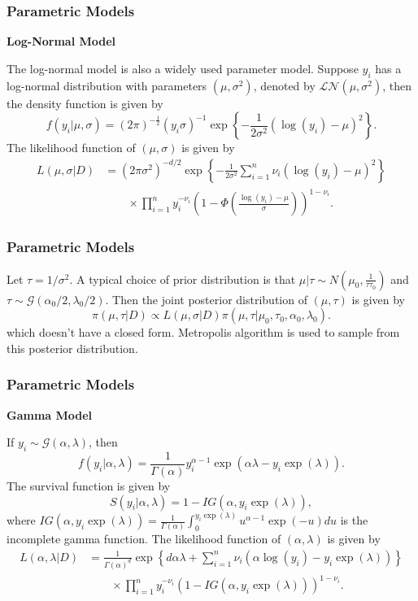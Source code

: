 \documentclass{beamer}
\begin{document}
	\begin{frame}
		\frametitle{Parametric Models}
		\textbf{Log-Normal Model}
		
		The log-normal model is also a widely used parameter model. Suppose $y_i$ has a log-normal distribution with parameters $(\mu, \sigma ^ 2 )$, denoted by $\mathcal{LN}(\mu, \sigma ^ 2)$, then the density function is given by 
		\[
		f(y_i | \mu, \sigma) = (2\pi) ^ {-\frac{1}{2}}(y_i\sigma) ^ {-1}\exp\left\{-\frac{1}{2\sigma^2}(\log(y_i) - \mu) ^ 2\right\}.
		\]
		The likelihood function of $(\mu, \sigma)$ is given by 
		\begin{equation*}
			\begin{split}
				L(\mu, \sigma | D) & = (2\pi\sigma^2) ^ {-d / 2}\exp\left\{-\frac{1}{2\sigma^2}\sum_{i = 1}^{n}\nu_i(\log(y_i) - \mu) ^ 2 \right\} \\
				& \quad\quad \times\prod_{i = 1}^{n}y_i ^ {-\nu_i}(1 - \Phi(\frac{\log(y_i) - \mu}{\sigma})) ^ {1 - \nu_i}.
			\end{split}
		\end{equation*}
	\end{frame}
	
	\begin{frame}
		\frametitle{Parametric Models}
		Let $\tau = 1 / \sigma ^ 2$. A typical choice of prior distribution is that $\mu | \tau \sim N(\mu_0, \frac{1}{\tau\tau_0})$ and $\tau \sim \mathcal{G}(\alpha_0 / 2, \lambda_0 / 2).$
		Then the joint posterior distribution of $(\mu, \tau)$ is given by 
		\[
		\pi(\mu, \tau | D) \propto L(\mu, \sigma | D)\pi(\mu, \tau | \mu_0, \tau_0, \alpha_0, \lambda_0).
		\]
		which doesn't have a closed form. Metropolis algorithm is used to sample from this posterior distribution.
	\end{frame}
	
	\begin{frame}
		\frametitle{Parametric Models}
		\textbf{Gamma Model}
		
		If $y_i \sim \mathcal{G}(\alpha, \lambda)$, then 
		\[
		f(y_i | \alpha, \lambda) = \frac{1}{\Gamma(\alpha)}y_i ^ {\alpha - 1}\exp(\alpha\lambda - y_i\exp(\lambda)).
		\]
		The survival function is given by 
		\[
		S(y_i | \alpha, \lambda) = 1 - IG(\alpha, y_i\exp(\lambda)),
		\] 
		where $IG(\alpha, y_i\exp(\lambda)) = \frac{1}{\Gamma(\alpha)}\int_{0}^{y_i\exp(\lambda)}u ^ {\alpha - 1}\exp(-u)du$
		is the incomplete gamma function. The likelihood function of $(\alpha, \lambda)$ is given by
		\begin{equation*}
			\begin{split}
				L(\alpha, \lambda | D) & = \frac{1}{\Gamma(\alpha) ^ d}\exp\left\{d\alpha\lambda + \sum_{i = 1}^{n}\nu_i(\alpha\log(y_i) - y_i\exp(\lambda))\right\} \\
				& \quad\quad\times\prod_{i = 1}^{n}y_i ^ {-\nu_i}(1 - IG(\alpha, y_i\exp(\lambda))) ^ {1 - \nu_i}.
			\end{split}
		\end{equation*}
	\end{frame}
\end{document}
